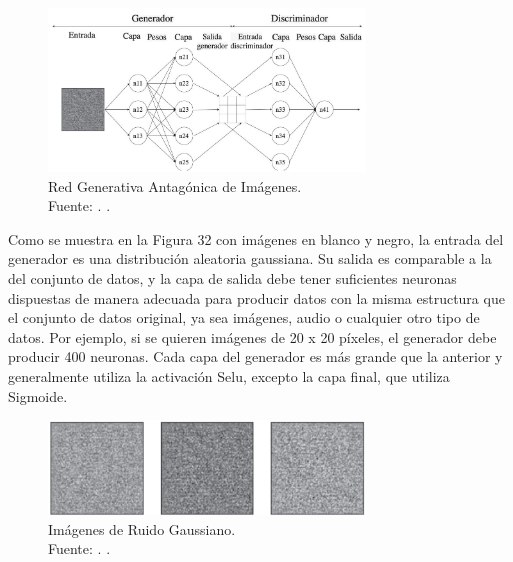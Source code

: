 \begin{figure}[!ht]
	\begin{center}
		\includegraphics[width=0.75\textwidth]{2/figures/redgan2.jpg}
		\caption[Red Generativa Antagónica de Imágenes]{Red Generativa Antagónica de Imágenes.\\
		Fuente: \cite{tec_goodfellow2014gan}. .}
		\label{2:fig48}
	\end{center}
\end{figure}

Como se muestra en la Figura 32 con imágenes en blanco y negro, la entrada del generador es una distribución aleatoria gaussiana. Su salida es comparable a la del conjunto de datos, y la capa de salida debe tener suficientes neuronas dispuestas de manera adecuada para producir datos con la misma estructura que el conjunto de datos original, ya sea imágenes, audio o cualquier otro tipo de datos. Por ejemplo, si se quieren imágenes de 20 x 20 píxeles, el generador debe producir 400 neuronas. Cada capa del generador es más grande que la anterior y generalmente utiliza la activación Selu, excepto la capa final, que utiliza Sigmoide. \parencite{tec_goodfellow2014gan}

\begin{figure}[!ht]
	\begin{center}
		\includegraphics[width=0.75\textwidth]{2/figures/redgan3.jpg}
		\caption[Imágenes de Ruido Gaussiano]{Imágenes de Ruido Gaussiano.\\
		Fuente: \cite{tec_goodfellow2014gan}. .}
		\label{2:fig49}
	\end{center}
\end{figure}


